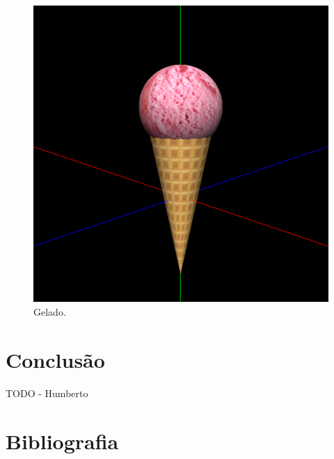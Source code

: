 \documentclass[12pt, a4paper]{article}
\begin{document}
\begin{figure}[H]
    \centering
    \includegraphics[width=\textwidth]{res/phase4/IceCreamXYZ.png}
    \caption{Gelado.}
\end{figure}

\section{Conclusão}

{\color{red} TODO - Humberto}

\begingroup
\section{Bibliografia}
\renewcommand{\section}[2]{}
\end{document}

